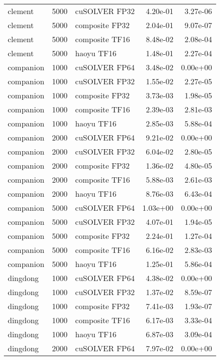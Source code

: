 \begin{table}
\begin{tabular}{lrlrr}
  clement &  5000 &  cuSOLVER FP32 &  4.20e-01 &        3.27e-06 \\
  clement &  5000 & composite FP32 &  2.04e-01 &        9.07e-07 \\
  clement &  5000 & composite TF16 &  8.48e-02 &        2.08e-04 \\
  clement &  5000 &     haoyu TF16 &  1.48e-01 &        2.27e-04 \\
companion &  1000 &  cuSOLVER FP64 &  3.48e-02 &        0.00e+00 \\
companion &  1000 &  cuSOLVER FP32 &  1.55e-02 &        2.27e-05 \\
companion &  1000 & composite FP32 &  3.73e-03 &        1.98e-05 \\
companion &  1000 & composite TF16 &  2.39e-03 &        2.81e-03 \\
companion &  1000 &     haoyu TF16 &  2.85e-03 &        5.88e-04 \\
companion &  2000 &  cuSOLVER FP64 &  9.21e-02 &        0.00e+00 \\
companion &  2000 &  cuSOLVER FP32 &  6.04e-02 &        2.80e-05 \\
companion &  2000 & composite FP32 &  1.36e-02 &        4.80e-05 \\
companion &  2000 & composite TF16 &  5.88e-03 &        2.61e-03 \\
companion &  2000 &     haoyu TF16 &  8.76e-03 &        6.43e-04 \\
companion &  5000 &  cuSOLVER FP64 &  1.03e+00 &        0.00e+00 \\
companion &  5000 &  cuSOLVER FP32 &  4.07e-01 &        1.94e-05 \\
companion &  5000 & composite FP32 &  2.24e-01 &        1.27e-04 \\
companion &  5000 & composite TF16 &  6.16e-02 &        2.83e-03 \\
companion &  5000 &     haoyu TF16 &  1.25e-01 &        5.86e-04 \\
 dingdong &  1000 &  cuSOLVER FP64 &  4.38e-02 &        0.00e+00 \\
 dingdong &  1000 &  cuSOLVER FP32 &  1.37e-02 &        8.59e-07 \\
 dingdong &  1000 & composite FP32 &  7.41e-03 &        1.93e-07 \\
 dingdong &  1000 & composite TF16 &  6.17e-03 &        3.33e-04 \\
 dingdong &  1000 &     haoyu TF16 &  6.87e-03 &        3.09e-04 \\
 dingdong &  2000 &  cuSOLVER FP64 &  7.97e-02 &        0.00e+00 \\

\end{tabular}
\end{table}
